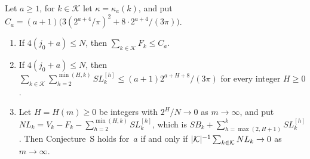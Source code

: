 \begin{proposition}\label{prop:S-local}
Let $a\ge1$, for $k\in\mathcal K$ let $\kappa=\kappa_a(k)$, and put $C_a=(a+1)\bigl(3(2^{a+4}/\pi)^2+8\cdot2^{a+4}/(3\pi)\bigr)$.
\begin{enumerate}[label=(\alph*)]
\item If $4(j_0+a)\le N$, then $\sum_{k\in\mathcal K}F_k\le C_a$.
\item If $4(j_0+a)\le N$, then $\sum_{k\in\mathcal K}\sum_{h=2}^{\min(H,k)}SL^{[h]}_k\le(a+1)2^{a+H+8}/(3\pi)$ for every
  integer $H\ge0$.
\item Let $H=H(m)\ge0$ be integers with $2^H/N\to0$ as $m\to\infty$, and put
  $NL_k=V_k-F_k-\sum_{h=2}^{\min(H,k)}SL^{[h]}_k$, which is $SB_k+\sum_{h=\max(2,H+1)}^kSL^{[h]}_k$. Then Conjecture~S holds
  for~$a$ if and only if $\lvert \mathcal K \rvert^{-1}\sum_{k\in\mathcal K}NL_k\to0$ as $m\to\infty$.
\end{enumerate}
\end{proposition}

